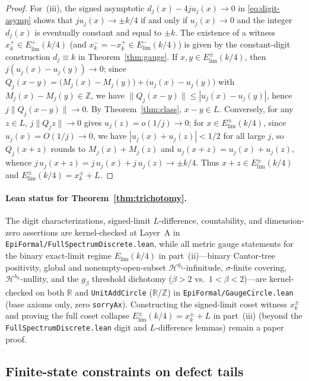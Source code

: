 \documentclass[11pt]{article}
\theoremstyle{definition}
\theoremstyle{remark}
\newcommand{\R}{\mathbb{R}}
\newcommand{\Z}{\mathbb{Z}}
\begin{document}
\begin{proof}
For~(iii), the signed asymptotic $d_j(x)-4ju_j(x)\to0$ in
\eqref{eq:digit-asymp} shows that $ju_j(x)\to\pm k/4$ if and only if
$u_j(x)\to0$ and the integer $d_j(x)$ is eventually constant and equal to
$\pm k$. The existence of a witness $x_k^+\in E_{\mathrm{lim}}^+(k/4)$ (and
$x_k^-=-x_k^+\in E_{\mathrm{lim}}^-(k/4)$) is given by the constant-digit
construction $d_j\equiv k$ in Theorem~\ref{thm:gauge}. If
$x,y\in E_{\mathrm{lim}}^\pm(k/4)$, then $j(u_j(x)-u_j(y))\to0$; since
$Q_j(x-y)=\bigl(M_j(x)-M_j(y)\bigr)+\bigl(u_j(x)-u_j(y)\bigr)$ with
$M_j(x)-M_j(y)\in\Z$, we have $\|Q_j(x-y)\|\le|u_j(x)-u_j(y)|$, hence
$j\|Q_j(x-y)\|\to0$. By Theorem~\ref{thm:class}, $x-y\in L$. Conversely, for
any $z\in L$, $j\|Q_jz\|\to0$ gives $u_j(z)=o(1/j)\to0$; for
$x\in E_{\mathrm{lim}}^\pm(k/4)$, since $u_j(x)=O(1/j)\to0$, we have
$|u_j(x)+u_j(z)|<1/2$ for all large $j$, so $Q_j(x+z)$ rounds to
$M_j(x)+M_j(z)$ and $u_j(x+z)=u_j(x)+u_j(z)$, whence
$j\,u_j(x+z)=j\,u_j(x)+j\,u_j(z)\to\pm k/4$. Thus $x+z\in E_{\mathrm{lim}}^\pm(k/4)$
and $E_{\mathrm{lim}}^\pm(k/4)=x_k^\pm+L$.
\end{proof}

\paragraph{Lean status for Theorem~\ref{thm:trichotomy}.}
The digit characterizations, signed-limit $L$-difference, countability, and
dimension-zero assertions are kernel-checked at Layer~A in
\texttt{EpiFormal/\allowbreak Full\allowbreak Spectrum\allowbreak Discrete.lean},
while all metric gauge statements for the binary exact-limit regime
$E_{\mathrm{lim}}(k/4)$ in part~(ii)---binary Cantor-tree positivity, global
and nonempty-open-subset $\mathcal H^{g_2}$-infinitude, $\sigma$-finite
covering, $\mathcal H^{h_k}$-nullity, and the $g_\beta$ threshold dichotomy
($\beta>2$ vs.\ $1<\beta<2$)---are kernel-checked on both $\R$ and
\texttt{UnitAddCircle} ($\R/\Z$) in
\texttt{EpiFormal/\allowbreak GaugeCircle.lean} (base axioms only, zero
\texttt{sorryAx}). Constructing the signed-limit coset witness $x_k^\pm$ and
proving the full coset collapse $E_{\mathrm{lim}}^\pm(k/4)=x_k^\pm+L$ in
part~(iii) (beyond the \texttt{Full\allowbreak Spectrum\allowbreak Discrete.lean}
digit and $L$-difference lemmas) remain a paper proof.

\subsection{Finite-state constraints on defect tails}\label{sec:finite-state-tail}
\end{document}
